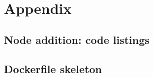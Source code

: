 \documentclass[12pt,twoside]{article}
\begin{document}
\newpage
\begin{comment}
\section*{User Guide}
\label{sec:UG}
\subsection*{\textit{Distributed Web Market}}
\newpage
\subsection*{\textit{Random Market}}
\newpage
\end{comment}
\section*{Appendix}
\subsection*{Node addition: code listings}

\newpage



\newpage
\subsection*{Dockerfile skeleton}

\newpage
\end{document}

